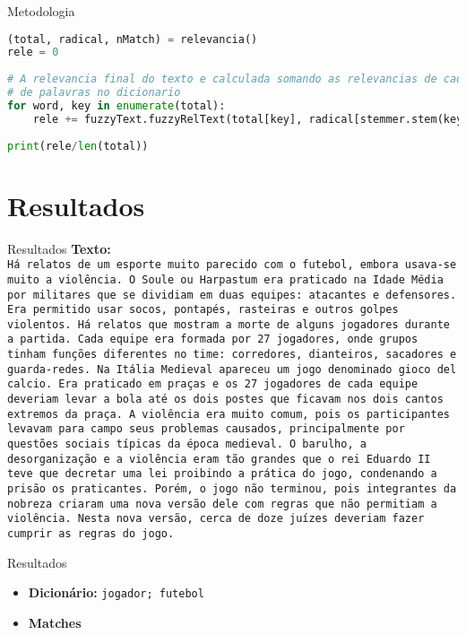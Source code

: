\documentclass{beamer}
\begin{document}
	\begin{frame}[fragile]{Metodologia}
\begin{lstlisting}[language=Python, caption = Lógica Fuzzy(cont.)]	
(total, radical, nMatch) = relevancia()
rele = 0
	
# A relevancia final do texto e calculada somando as relevancias de cada palavra do dicionario dividido pela quantidade
# de palavras no dicionario
for word, key in enumerate(total):
	rele += fuzzyText.fuzzyRelText(total[key], radical[stemmer.stem(key)], nMatch[stemmer.stem(key)])
	
print(rele/len(total))  
\end{lstlisting}
	\end{frame}
	
	\section{Resultados}
	\begin{frame}{Resultados}
		\textbf{Texto:}\\
		\texttt{\tiny Há relatos de um esporte muito parecido com o futebol, embora usava-se muito a violência. O Soule ou Harpastum era praticado na Idade Média por militares que se dividiam em duas equipes: atacantes e defensores. Era permitido usar socos, pontapés, rasteiras e outros golpes violentos. Há relatos que mostram a morte de alguns jogadores durante a partida. Cada equipe era formada por 27 jogadores, onde grupos tinham funções diferentes no time: corredores, dianteiros, sacadores e guarda-redes.
			Na Itália Medieval apareceu um jogo denominado gioco del calcio. Era praticado em praças e os 27 jogadores de cada equipe deveriam levar a bola até os dois postes que ficavam nos dois cantos extremos da praça. A violência era muito comum, pois os participantes levavam para campo seus problemas causados, principalmente por questões sociais típicas da época medieval. 
			O barulho, a desorganização e a violência eram tão grandes que o rei Eduardo II teve que decretar uma lei proibindo a prática do jogo, condenando a prisão os praticantes. Porém, o jogo não terminou, pois integrantes da nobreza criaram uma nova versão dele com regras que não permitiam a violência. Nesta nova versão, cerca de doze juízes deveriam fazer cumprir as regras do jogo.
			}  
	\end{frame}
	
	\begin{frame}{Resultados}
		\begin{itemize}
			\item \textbf{Dicionário:  }\texttt{jogador;  futebol}\\
			\item \textbf{Matches}
		\end{itemize}
	\end{frame}
	
\end{document}
